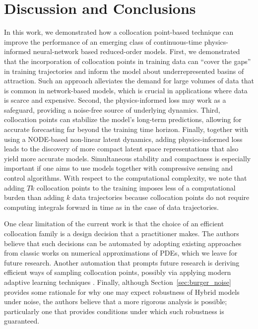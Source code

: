 \section{Discussion and Conclusions}

In this work, we demonstrated how a collocation point-based technique can improve the performance of an emerging class of continuous-time physics-informed neural-network based reduced-order models. First, we demonstrated that the incorporation of collocation points in training data can ``cover the gaps'' in training trajectories and inform the model about underrepresented basins of attraction. Such an approach alleviates the demand for large volumes of data that is common in network-based models, which is crucial in applications where data is scarce and expensive. Second, the physics-informed loss may work as a safeguard, providing a noise-free source of underlying dynamics.
Third, collocation points can stabilize the model's long-term predictions, allowing for accurate forecasting far beyond the training time horizon. Finally, together with using a NODE-based non-linear latent dynamics, adding physics-informed loss leads to the discovery of more compact latent space representations that also yield more accurate models. Simultaneous stability and compactness is especially important if one aims to use models together with compressive sensing and control algorithms. With respect to the computational complexity, we note that adding $Tk$ collocation points to the training imposes less of a computational burden than adding $k$ data trajectories because collocation points do not require computing integrals forward in time as in the case of data trajectories.

One clear limitation of the current work is that the choice of an efficient collocation family is a design decision that a practitioner makes. The authors believe that such decisions can be automated by adopting existing approaches from classic works on numerical approximations of PDEs, which we leave for future research. Another automation that prompts future research is deriving efficient ways of sampling collocation points, possibly via applying modern adaptive learning techniques \cite{subramanian2022adaptive}. Finally, although Section~\ref{sec:burger_noise} provides some rationale for why one may expect robustness of Hybrid models under noise, the authors believe that a more rigorous analysis is possible; particularly one that provides conditions under which such robustness is guaranteed. 
